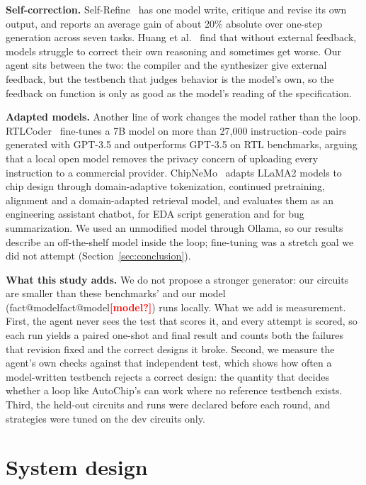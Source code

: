 \documentclass[11pt,a4paper]{article}
\makeatletter
\newcommand{\fact}[1]{\ifcsname fact@#1\endcsname\csname fact@#1\endcsname\else\textcolor{red}{\textbf{[#1?]}}\fi}
\makeatother
\begin{document}
\textbf{Self-correction.} Self-Refine~\cite{selfrefine} has one model write, critique and revise its own output, and
reports an average gain of about 20\% absolute over one-step generation across seven tasks. Huang
et al.~\cite{huang2024} find that without external feedback, models struggle to correct their own reasoning and
sometimes get worse. Our agent sits between the two: the compiler and the synthesizer give external feedback, but
the testbench that judges behavior is the model's own, so the feedback on function is only as good as the model's
reading of the specification.

\textbf{Adapted models.} Another line of work changes the model rather than the loop. RTLCoder~\cite{rtlcoder}
fine-tunes a 7B model on more than 27,000 instruction--code pairs generated with GPT-3.5 and outperforms GPT-3.5 on
RTL benchmarks, arguing that a local open model removes the privacy concern of uploading every instruction to a
commercial provider. ChipNeMo~\cite{chipnemo} adapts LLaMA2 models to chip design through domain-adaptive
tokenization, continued pretraining, alignment and a domain-adapted retrieval model, and evaluates them as an
engineering assistant chatbot, for EDA script generation and for bug summarization. We used an unmodified model
through Ollama, so our results describe an off-the-shelf model inside the loop; fine-tuning was a stretch goal we did
not attempt (Section~\ref{sec:conclusion}).

\textbf{What this study adds.} We do not propose a stronger generator: our circuits are smaller than these
benchmarks' and our model (\fact{model}) runs locally. What we add is measurement. First, the agent never sees the
test that scores it, and every attempt is scored, so each run yields a paired one-shot and final result and counts
both the failures that revision fixed and the correct designs it broke. Second, we measure the agent's own checks
against that independent test, which shows how often a model-written testbench rejects a correct design: the
quantity that decides whether a loop like AutoChip's can work where no reference testbench exists. Third, the
held-out circuits and runs were declared before each round, and strategies were tuned on the dev circuits only.

\section{System design}\label{sec:design}
\end{document}
